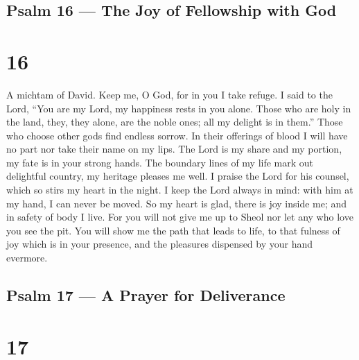 \hypertarget{psalm-16-the-joy-of-fellowship-with-god}{%
\subsection{Psalm 16 --- The Joy of Fellowship with
God}\label{psalm-16-the-joy-of-fellowship-with-god}}

\hypertarget{section-15}{%
\section{16}\label{section-15}}

A michtam of David.  Keep me, O God, for in you I take
refuge.  I said to the Lord, ``You are my Lord, my happiness
rests in you alone.  Those who are holy in the land, they,
they alone, are the noble ones; all my delight is in them.''
 Those who choose other gods find endless sorrow. In their
offerings of blood I will have no part nor take their name on my lips.
 The Lord is my share and my portion, my fate is in your
strong hands.  The boundary lines of my life mark out
delightful country, my heritage pleases me well.  I praise
the Lord for his counsel, which so stirs my heart in the night.
 I keep the Lord always in mind: with him at my hand, I can
never be moved.  So my heart is glad, there is joy inside
me; and in safety of body I live.  For you will not give me
up to Sheol nor let any who love you see the pit.  You will
show me the path that leads to life, to that fulness of joy which is in
your presence, and the pleasures dispensed by your hand evermore.

\hypertarget{psalm-17-a-prayer-for-deliverance}{%
\subsection{Psalm 17 --- A Prayer for
Deliverance}\label{psalm-17-a-prayer-for-deliverance}}

\hypertarget{section-16}{%
\section{17}\label{section-16}}


